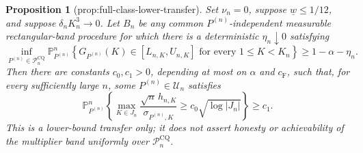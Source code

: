 \documentclass{article}
\newtheorem{proposition}{Proposition}
\begin{document}
\begin{proposition}[prop:full-class-lower-transfer]\label{prop:full-class-lower-transfer}
Set \(\nu_n=0\), suppose \(\underline w\leq1/12\), and suppose \(\delta_nK_n^3\to0\).  Let \(B_n\) be any common \(P^{(n)}\)-independent measurable rectangular-band procedure for which there is a deterministic \(\eta_n\downarrow0\) satisfying
\[
 \inf_{P^{(n)}\in\mathcal P_n^{\mathrm{CQ}}}
 \mathbb P_{P^{(n)}}^n\!\left\{
 G_{P^{(n)}}(K)\in[L_{n,K},U_{n,K}]
 \text{ for every }1\leq K<K_n\right\}
 \geq1-\alpha-\eta_n.
\]
Then there are constants \(c_0,c_1>0\), depending at most on \(\alpha\) and \(c_{\mathrm F}\), such that, for every sufficiently large \(n\), some \(P^{(n)}\in\mathcal U_n\) satisfies
\[
 \mathbb P_{P^{(n)}}^n\!\left\{
 \max_{K\in J_n}\frac{\sqrt n\,h_{n,K}}{\sigma_{P^{(n)},K}}
 \geq c_0\sqrt{\log|J_n|}\right\}\geq c_1.
\]
This is a lower-bound transfer only; it does not assert honesty or achievability of the multiplier band uniformly over \(\mathcal P_n^{\mathrm{CQ}}\).
\end{proposition}
\end{document}
